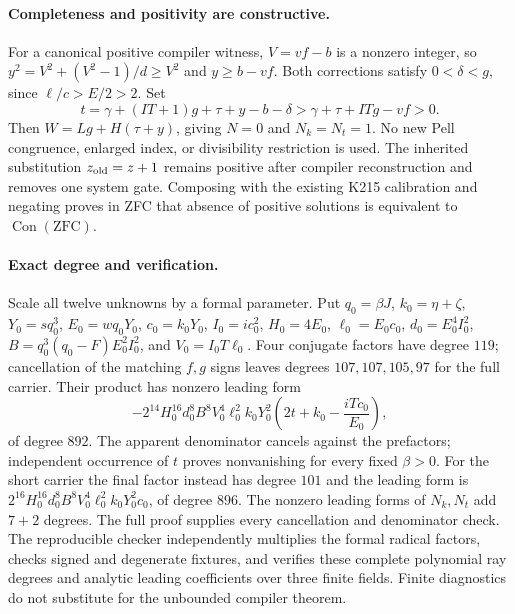 \paragraph{Completeness and positivity are constructive.}
For a canonical positive compiler witness, $V=vf-b$ is a nonzero integer,
so $y^2=V^2+(V^2-1)/d\ge V^2$ and $y\ge b-vf$.
Both corrections satisfy $0<\delta<g$, since $\ell/c>E/2>2$.
Set
\[
 t=\gamma+(IT+1)g+\tau+y-b-\delta
   >\gamma+\tau+ITg-vf>0.
\]
Then $W=Lg+H(\tau+y)$, giving $N=0$ and $N_k=N_t=1$.
No new Pell congruence, enlarged index, or divisibility restriction is used.
The inherited substitution $z_{\rm old}=z+1$ remains positive after compiler
reconstruction and removes one system gate.  Composing with the existing
K215 calibration and negating proves in ZFC that absence of positive
solutions is equivalent to $\operatorname{Con}(\mathrm{ZFC})$.

\paragraph{Exact degree and verification.}
Scale all twelve unknowns by a formal parameter.  Put
$q_0=\beta J$, $k_0=\eta+\zeta$, $Y_0=sq_0^3$,
$E_0=wq_0Y_0$, $c_0=k_0Y_0$, $I_0=ic_0^2$, $H_0=4E_0$,
$\ell_0=E_0c_0$, $d_0=E_0^4I_0^2$,
$B=q_0^3(q_0-F)E_0^2I_0^2$, and $V_0=I_0T\ell_0$.
Four conjugate factors have degree $119$; cancellation of the matching
$f,g$ signs leaves degrees $107,107,105,97$ for the full carrier.
Their product has nonzero leading form
\[
 -2^{14}H_0^{16}d_0^8B^8V_0^4\ell_0^2k_0Y_0^2
 \left(2t+k_0-\frac{iTc_0}{E_0}\right),
\]
of degree $892$.  The apparent denominator cancels against the prefactors;
independent occurrence of $t$ proves nonvanishing for every fixed $\beta>0$.
For the short carrier the final factor instead has degree $101$ and the
leading form is
$2^{16}H_0^{16}d_0^8B^8V_0^4\ell_0^2k_0Y_0^2c_0$, of degree $896$.
The nonzero leading forms of $N_k,N_t$ add $7+2$ degrees.
The full proof supplies every cancellation and denominator check.
The reproducible checker independently multiplies the formal radical factors,
checks signed and degenerate fixtures, and verifies these complete polynomial
ray degrees and analytic leading coefficients over three finite fields.
Finite diagnostics do not substitute for the unbounded compiler theorem.
